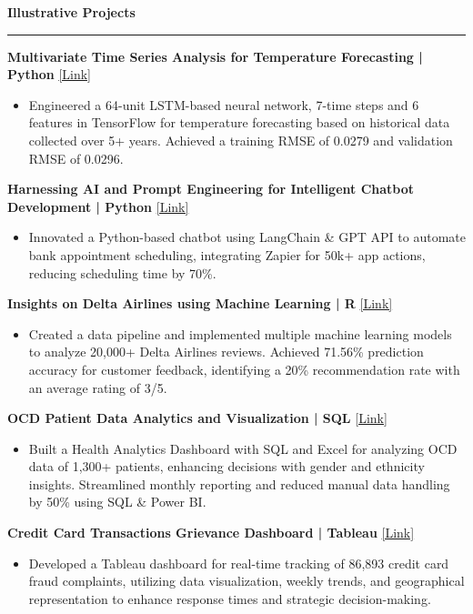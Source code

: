 \documentclass[10pt]{article}
\newcommand{\sectiontitle}[1]{\vspace{0.5em}\textbf{\large #1}\vspace{0.5em}\hrule\vspace{0.5em}}
\newcommand{\jobtitle}[1]{\textbf{#1}}
\newcommand{\projectlink}[1]{\hfill\href{#1}{[Link]}}
\begin{document}
\sectiontitle{Illustrative Projects}
\jobtitle{Multivariate Time Series Analysis for Temperature Forecasting | Python} \projectlink{https://github.com/rahul-chauhan}
\begin{itemize}[leftmargin=*]
    \item Engineered a 64-unit LSTM-based neural network, 7-time steps and 6 features in TensorFlow for temperature forecasting based on historical data collected over 5+ years. Achieved a training RMSE of 0.0279 and validation RMSE of 0.0296.
\end{itemize}

\jobtitle{Harnessing AI and Prompt Engineering for Intelligent Chatbot Development | Python} \projectlink{https://github.com/rahul-chauhan}
\begin{itemize}[leftmargin=*]
    \item Innovated a Python-based chatbot using LangChain \& GPT API to automate bank appointment scheduling, integrating Zapier for 50k+ app actions, reducing scheduling time by 70\%.
\end{itemize}

\jobtitle{Insights on Delta Airlines using Machine Learning | R} \projectlink{https://website.com}
\begin{itemize}[leftmargin=*]
    \item Created a data pipeline and implemented multiple machine learning models to analyze 20,000+ Delta Airlines reviews. Achieved 71.56\% prediction accuracy for customer feedback, identifying a 20\% recommendation rate with an average rating of 3/5.
\end{itemize}

\jobtitle{OCD Patient Data Analytics and Visualization | SQL} \projectlink{https://github.com/rahul-chauhan}
\begin{itemize}[leftmargin=*]
    \item Built a Health Analytics Dashboard with SQL and Excel for analyzing OCD data of 1,300+ patients, enhancing decisions with gender and ethnicity insights. Streamlined monthly reporting and reduced manual data handling by 50\% using SQL \& Power BI.
\end{itemize}

\jobtitle{Credit Card Transactions Grievance Dashboard | Tableau} \projectlink{https://tableau.com}
\begin{itemize}[leftmargin=*]
    \item Developed a Tableau dashboard for real-time tracking of 86,893 credit card fraud complaints, utilizing data visualization, weekly trends, and geographical representation to enhance response times and strategic decision-making.
\end{itemize}
\end{document}
